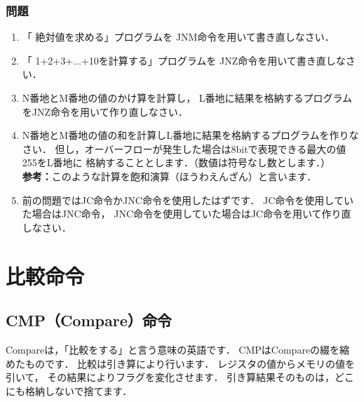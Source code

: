 \vfill
\subsubsection{問題}
\begin{enumerate}
\item 「 絶対値を求める」プログラムを
JNM命令を用いて書き直しなさい．

\item 「 1+2+3+...+10を計算する」プログラムを
JNZ命令を用いて書き直しなさい．

\item N番地とM番地の値のかけ算を計算し，
L番地に結果を格納するプログラムをJNZ命令を用いて作り直しなさい．

\item N番地とM番地の値の和を計算しL番地に結果を格納するプログラムを作りなさい．
但し，オーバーフローが発生した場合は8bitで表現できる最大の値255をL番地に
格納することとします．（数値は符号なし数とします．）\\
{\bf 参考：}このような計算を飽和演算（ほうわえんざん）と言います．

\item 前の問題ではJC命令かJNC命令を使用したはずです．
JC命令を使用していた場合はJNC命令，
JNC命令を使用していた場合はJC命令を用いて作り直しなさい．
\end{enumerate}
\vfill

\newpage
\section{比較命令}
\label{comp}

\subsection{CMP（Compare）命令}
Compareは，「比較をする」と言う意味の英語です．
CMPはCompareの綴を縮めたものです．
比較は引き算により行います．
レジスタの値からメモリの値を引いて，
その結果によりフラグを変化させます．
引き算結果そのものは，どこにも格納しないで捨てます．

